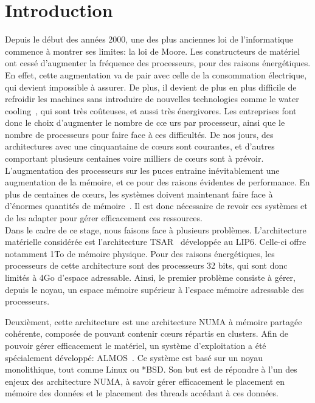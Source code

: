 \chapter{Introduction}

  \hspace{1cm}Depuis le début des années 2000, une des plus anciennes loi de
  l'informatique commence à montrer ses limites: la loi de Moore. Les
  constructeurs de matériel ont cessé d'augmenter la fréquence des processeurs,
  pour des raisons énergétiques. En effet, cette augmentation va de pair avec
  celle de la consommation électrique, qui devient impossible à assurer. De
  plus, il devient de plus en plus difficile de refroidir les machines sans
  introduire de nouvelles technologies comme le water
  cooling~\citep{googleXXXXdatacenters}, qui sont très coûteuses, et aussi très
  énergivores. Les entreprises font donc le choix d'augmenter le nombre de c\oe
  urs par processeur, ainsi que le nombre de processeurs pour faire face à ces
  difficultés. De nos jours, des architectures avec une cinquantaine de c\oe urs
  sont courantes, et d'autres comportant plusieurs centaines voire milliers de
  c\oe urs sont à prévoir. L'augmentation des processeurs sur les puces entraine
  inévitablement une augmentation de la mémoire, et ce pour des raisons
  évidentes de performance. En plus de centaines de c\oe urs, les systèmes
  doivent maintenant faire face à d'énormes quantités de
  mémoire~\citep{hp2012z820, puget2013z9pe}. Il est donc nécessaire de revoir
  ces systèmes et de les adapter pour gérer efficacement ces ressources.\\

  \hspace{1cm} Dans le cadre de ce stage, nous faisons face à plusieurs
  problèmes. L'architecture matérielle considérée est l'architecture
  TSAR~\citep{greiner2009tsar} développée au LIP6. Celle-ci offre notamment 1To
  de mémoire physique. Pour des raisons énergétiques, les processeurs de cette
  architecture sont des processeurs 32 bits, qui sont donc limités à 4Go
  d'espace adressable. Ainsi, le premier problème consiste à gérer, depuis le
  noyau, un espace mémoire supérieur à l'espace mémoire adressable des
  processeurs.

  Deuxièment, cette architecture est une architecture NUMA à mémoire partagée
  cohérente, composée de pouvant contenir c\oe urs répartis en clusters. Afin de
  pouvoir gérer efficacement le matériel, un système d'exploitation a été
  spécialement développé: ALMOS~\citep{almaless2011almos}. Ce système est basé
  sur un noyau monolithique, tout comme Linux ou *BSD. Son but est de répondre à
  l'un des enjeux des architecture NUMA, à savoir gérer efficacement le
  placement en mémoire des données et le placement des threads accédant à ces
  données.

